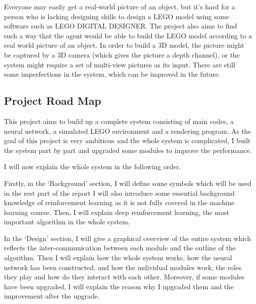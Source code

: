 \documentclass[a4paper]{article}
\begin{document}
            Everyone may easily get a real-world picture of an object, but it’s hard
            for a person who is lacking designing skills to design a LEGO model using
            some software such as LEGO DIGITAL DESIGNER. The project also aims to find
            such a way that the agent would be able to build the LEGO model according
            to a real world picture of an object. In order to build a 3D model, the
            picture might be captured by a 3D camera (which gives the picture a depth
            channel), or the system might require a set of multi-view pictures as its
            input. There are still some imperfections in the system, which can be
            improved in the future.
            
        \subsection{Project Road Map}
            This project aims to build up a complete system consisting of main codes,
            a neural network, a simulated LEGO environment and a rendering program.
            As the goal of this project is very ambitious and the whole system is
            complicated, I built the system part by part and upgraded some modules
            to improve the performance. 
            
            I will now explain the whole system in the following order. 
            
            Firstly, in the `Background' section, I will define some symbols which
            will be used in the rest part of the report I will also introduce some
            essential background knowledge of reinforcement learning as it is not
            fully covered in the machine learning course. Then, I will explain deep
            reinforcement learning, the most important algorithm in the whole system. 
            
            In the `Design' section, I will give a graphical overview of the entire
            system which reflects the inter-communication between each module and
            the outline of the algorithm. Then I will explain how the whole system
            works, how the neural network has been constructed, and how the individual
            modules work, the roles they play and how do they interact with each other.
            Moreover, if some modules have been upgraded, I will explain the reason why
            I upgraded them and the improvement after the upgrade. 
            
\end{document}
